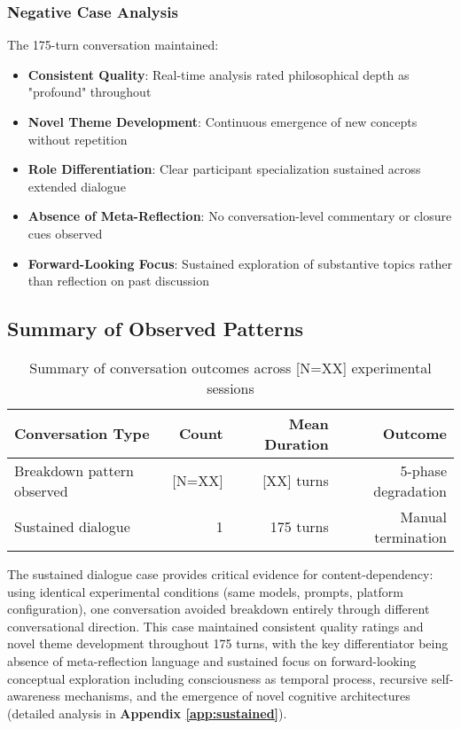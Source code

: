\documentclass[11pt,letterpaper]{article}
\newcommand{\totalSessions}{[N=XX]} %
\newcommand{\breakdownSessions}{[N=XX]} %
\newcommand{\meanBreakdownTurn}{[XX]} %
\newcommand{\negativeCase}{175} %
\begin{document}
\subsubsection{Negative Case Analysis}

The \negativeCase{}-turn conversation maintained:
\begin{itemize}
    \item \textbf{Consistent Quality}: Real-time analysis rated philosophical depth as "profound" throughout
    \item \textbf{Novel Theme Development}: Continuous emergence of new concepts without repetition
    \item \textbf{Role Differentiation}: Clear participant specialization sustained across extended dialogue
    \item \textbf{Absence of Meta-Reflection}: No conversation-level commentary or closure cues observed
    \item \textbf{Forward-Looking Focus}: Sustained exploration of substantive topics rather than reflection on past discussion
\end{itemize}

\subsection{Summary of Observed Patterns}

\begin{table}[h]
\centering
\begin{tabular}{lrrr}
\toprule
\textbf{Conversation Type} & \textbf{Count} & \textbf{Mean Duration} & \textbf{Outcome} \\
\midrule
Breakdown pattern observed & \breakdownSessions{} & \meanBreakdownTurn{} turns & 5-phase degradation \\
Sustained dialogue & 1 & \negativeCase{} turns & Manual termination \\
\bottomrule
\end{tabular}
\caption{Summary of conversation outcomes across \totalSessions{} experimental sessions}
\label{tab:conversation_outcomes}
\end{table}

The sustained dialogue case provides critical evidence for content-dependency: using identical experimental conditions (same models, prompts, platform configuration), one conversation avoided breakdown entirely through different conversational direction. This case maintained consistent quality ratings and novel theme development throughout \negativeCase{} turns, with the key differentiator being absence of meta-reflection language and sustained focus on forward-looking conceptual exploration including consciousness as temporal process, recursive self-awareness mechanisms, and the emergence of novel cognitive architectures (detailed analysis in \textbf{Appendix \ref{app:sustained}}).
\end{document}
